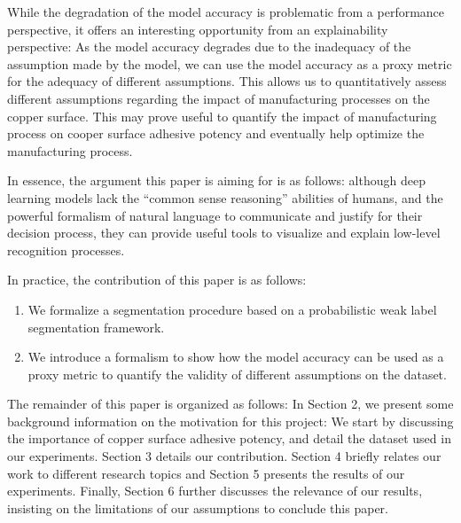 \documentclass[10pt,twocolumn,letterpaper]{article}
\begin{document}
While the degradation of the model accuracy is problematic from a performance perspective,
it offers an interesting opportunity from an explainability perspective:
As the model accuracy degrades due to the inadequacy of the assumption 
made by the model,
we can use the model accuracy as a proxy metric 
for the adequacy of different assumptions.
This allows us to quantitatively assess different assumptions regarding the impact 
of manufacturing processes on the copper surface. 
This may prove useful to quantify the impact of manufacturing process on cooper surface adhesive potency
and eventually help optimize the manufacturing process.
	
In essence, the argument this paper is aiming for is as follows: 
although deep learning models lack the ``common sense reasoning'' abilities of humans,
and the powerful formalism of natural language to communicate and justify for their decision process, 
they can provide useful tools to visualize and explain low-level recognition processes.

In practice, the contribution of this paper is as follows:
\begin{enumerate}
\item  We formalize a segmentation procedure based on a probabilistic weak label segmentation framework.
\item  We introduce a formalism to show how the model accuracy can be used as a proxy metric to quantify the validity of different assumptions on the dataset.
\end{enumerate}
	
The remainder of this paper is organized as follows:
In Section 2, we present some background information on the motivation for this project:
We start by discussing the importance of copper surface adhesive potency,
and detail the dataset used in our experiments. 
Section 3 details our contribution.
Section 4 briefly relates our work to different research topics 
and Section 5 presents the results of our experiments.
Finally, Section 6 further discusses the relevance of our results, insisting on the limitations of our assumptions to conclude this paper.
	
\end{document}
